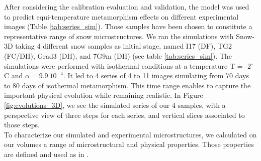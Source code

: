 \documentclass[draft,ms]{agujournal2019}
\begin{document}
After considering the calibration evaluation and validation, the model was used to predict equi-temperature metamorphism effects on different experimental images (Table \ref{tab:series_sim}). Those samples have been chosen to constitute a representative range of snow microstructures. We ran the simulations with Snow-3D taking 4 different snow samples as initial stage, named I17 (DF), TG2 (FC/DH), Grad3 (DH), and 7G9m (DH) (see table \ref{tab:series_sim}). The simulations were performed with isothermal conditions at a temperature T = -2$^\circ$C and $\alpha = 9.9\ 10^{-4}$. It led to 4 series of 4 to 11 images simulating from 70 days to 80 days of isothermal metamorphism. This time range enables to capture the important physical evolution while remaining realistic. In Figure \ref{fig:evolutions_3D}, we see the simulated series of our 4 samples, with a perspective view of three steps for each series, and vertical slices associated to those steps.\\

To characterize our simulated and experimental microstructures, we calculated on our volumes a range of microstructural and physical properties. Those properties are defined and used as in .
\end{document}
